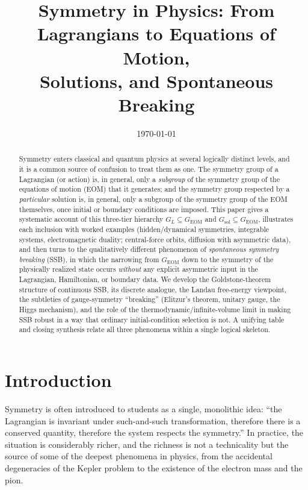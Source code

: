 \documentclass[11pt]{article}
\title{\textbf{Symmetry in Physics: From Lagrangians to Equations of Motion, \\
Solutions, and Spontaneous Breaking}}
\author{}
\date{\today}
\theoremstyle{definition}
\theoremstyle{remark}
\newcommand{\GEOM}{G_{\mathrm{EOM}}}
\newcommand{\GL}{G_{L}}
\begin{document}
\maketitle

\begin{abstract}
\noindent
Symmetry enters classical and quantum physics at several logically distinct levels, and it is a common source of confusion to treat them as one. The symmetry group of a Lagrangian (or action) is, in general, only a \emph{subgroup} of the symmetry group of the equations of motion (EOM) that it generates; and the symmetry group respected by a \emph{particular} solution is, in general, only a subgroup of the symmetry group of the EOM themselves, once initial or boundary conditions are imposed. This paper gives a systematic account of this three-tier hierarchy $\GL \subseteq \GEOM$ and $G_{\text{sol}}\subseteq \GEOM$, illustrates each inclusion with worked examples (hidden/dynamical symmetries, integrable systems, electromagnetic duality; central-force orbits, diffusion with asymmetric data), and then turns to the qualitatively different phenomenon of \emph{spontaneous symmetry breaking} (SSB), in which the narrowing from $\GEOM$ down to the symmetry of the physically realized state occurs \emph{without} any explicit asymmetric input in the Lagrangian, Hamiltonian, or boundary data. We develop the Goldstone-theorem structure of continuous SSB, its discrete analogue, the Landau free-energy viewpoint, the subtleties of gauge-symmetry ``breaking'' (Elitzur's theorem, unitary gauge, the Higgs mechanism), and the role of the thermodynamic/infinite-volume limit in making SSB robust in a way that ordinary initial-condition selection is not. A unifying table and closing synthesis relate all three phenomena within a single logical skeleton.
\end{abstract}

\tableofcontents

\section{Introduction}

Symmetry is often introduced to students as a single, monolithic idea: ``the Lagrangian is invariant under such-and-such transformation, therefore there is a conserved quantity, therefore the system respects the symmetry.'' In practice, the situation is considerably richer, and the richness is not a technicality but the source of some of the deepest phenomena in physics, from the accidental degeneracies of the Kepler problem to the existence of the electron mass and the pion.
\end{document}
